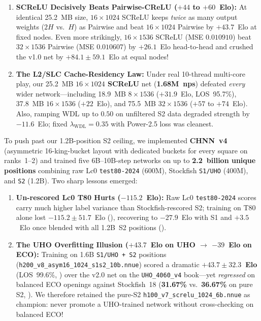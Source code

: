 \documentclass[10.5pt,letterpaper]{article}
\begin{document}
\begin{takeawaybox}
\begin{enumerate}
    \item \textbf{SCReLU Decisively Beats Pairwise-CReLU ($+44$ to $+60$~Elo):} At identical 25.2~MB size, $16\times 1024$ SCReLU keeps \emph{twice} as many output weights ($2H$ vs.\ $H$) as Pairwise and beat $16\times 1024$ Pairwise by $+43.7$~Elo at fixed nodes. Even more strikingly, $16\times 1536$ SCReLU (MSE $0.010910$) beat $32\times 1536$ Pairwise (MSE $0.010607$) by $+26.1$~Elo head-to-head and crushed the v1.0 net by $+84.1 \pm 59.1$~Elo at equal nodes!
    \item \textbf{The L2/SLC Cache-Residency Law:} Under real 10-thread multi-core play, our 25.2~MB \textbf{$16\times 1024$ SCReLU} net (\textbf{1.68M~nps}) defeated \emph{every} wider network—including 18.9~MB $8\times 1536$ ($+31.9$~Elo, LOS~95.7\%), 37.8~MB $16\times 1536$ ($+22$~Elo), and 75.5~MB $32\times 1536$ ($+57$ to $+74$~Elo). Also, ramping WDL up to $0.50$ on unfiltered S2 data degraded strength by $-11.6$~Elo; fixed $\lambda_{\text{WDL}}=0.35$ with Power-2.5 loss was cleanest.
\end{enumerate}
\end{takeawaybox}

\begin{failurebox}
To push past our 1.2B-position S2 ceiling, we implemented \textbf{CHNN~v4} (asymmetric 16-king-bucket layout with dedicated buckets for every square on ranks~1--2) and trained five 6B--10B-step networks on up to \textbf{2.2~billion unique positions} combining raw Lc0 \texttt{test80-2024} (600M), Stockfish \texttt{S1/UHO} (400M), and \texttt{S2} (1.2B). Two sharp lessons emerged:
\begin{enumerate}
    \item \textbf{Un-rescored Lc0 T80 Hurts ($-115.2$~Elo):} Raw Lc0 \texttt{test80-2024} scores carry much higher label variance than Stockfish-rescored S2; training on T80 alone lost $-115.2 \pm 51.7$~Elo (), recovering to $-27.9$~Elo with S1 and $+3.5$~Elo once blended with all 1.2B~S2 positions ().
    \item \textbf{The UHO Overfitting Illusion ($+43.7$~Elo on UHO $\to$ $-39$~Elo on ECO):} Training on 1.6B \texttt{S1/UHO + S2} positions (\texttt{h200\_v8\_asym16\_1024\_s1s2\_10b.nnue}) scored a dramatic \textbf{$+43.7 \pm 32.3$~Elo} (LOS~99.6\%, ) over the v2.0 net on the \texttt{UHO\_4060\_v4} book—yet \emph{regressed} on balanced ECO openings against Stockfish~18 (\textbf{31.67\%} vs.\ \textbf{36.67\%} on pure S2, ). We therefore retained the pure-S2 \texttt{h100\_v7\_screlu\_1024\_6b.nnue} as champion: never promote a UHO-trained network without cross-checking on balanced ECO!
\end{enumerate}
\end{failurebox}
\end{document}
